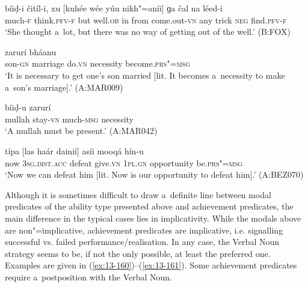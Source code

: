 \begin{exe}
\ex
\label{ex:13-156}
\gll bíiḍ-i čitíl-i, xu [kuhée wée yúu   nikh"=aníi] ɡa čal na léed-i  \\
much-\textsc{f} think.\textsc{pfv-f} but well.\textsc{ob} in from  come.out-\textsc{vn} any trick \textsc{neg} find.\textsc{pfv-f}  \\
\glt `She thought a~lot, but there was no way of getting out of the well.' (B:FOX)

\ex
\label{ex:13-157}
 zarurí bháanu \\
son-\textsc{gn} marriage do.\textsc{vn} necessity become.\textsc{prs"=msg}  \\
\glt `It is necessary to get one's son married [lit. It becomes a~necessity to make a~son's marriage].' (A:MAR009)

\ex
\label{ex:13-158}
\gll [muloó haans"=ainií] bíiḍ-u zarurí \\
mullah stay-\textsc{vn}  much-\textsc{msg} necessity  \\
\glt `A mullah must be present.' (A:MAR042)

\ex
\label{ex:13-159}
\gll típa [las haár dainií] asíi mooqá  hín-u \\
now \textsc{3sg.dist.acc} defeat give.\textsc{vn} \textsc{1pl.gn} opportunity be.\textsc{prs"=msg}  \\
\glt `Now we can defeat him [lit. Now is our opportunity to defeat him].' (A:BEZ070) 
\end{exe}

 Although it is sometimes difficult to draw a~definite line between modal predicates of the ability type presented above and achievement predicates, the main difference in the typical cases lies in implicativity. While the modals above are non"=implicative, achievement predicates are implicative, i.e. signalling successful vs. failed performance/realisation. In any case, the Verbal Noun strategy seems to be, if not the only possible, at least the preferred one. Examples are given in (\ref{ex:13-160})--(\ref{ex:13-161}). Some achievement predicates require a~postposition with the Verbal Noun.

